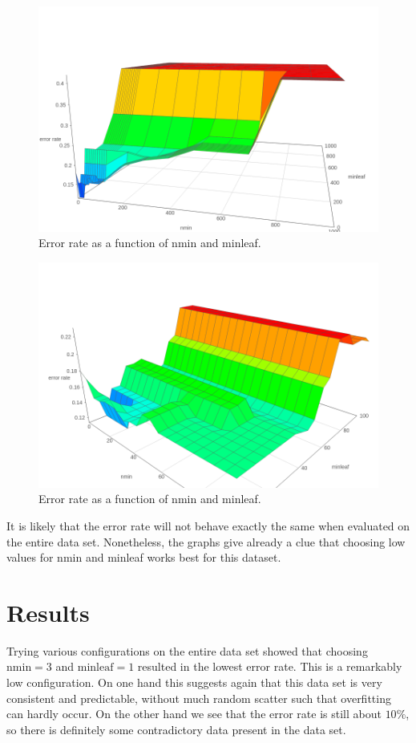 \documentclass[12pt]{article}
\theoremstyle{definition}
\begin{document}
\begin{figure}[H]
    \centering
    \includegraphics[width=0.8\linewidth]{graph1.png}
    \caption{Error rate as a function of nmin and minleaf.}
\label{fig:graph1}
\end{figure}

\begin{figure}[H]
    \centering
    \includegraphics[width=0.8\linewidth]{graph2.png}
    \caption{Error rate as a function of nmin and minleaf.}
\label{fig:graph2}
\end{figure}


It is likely that the error rate will not behave exactly the same when evaluated on
the entire data set.
Nonetheless, the graphs give already a clue that choosing low values for nmin and minleaf
works best for this dataset.

\section{Results}
\label{sec:results}

Trying various configurations on the entire data set showed that choosing
$\mathrm{nmin} = 3$ and $\mathrm{minleaf} = 1$ resulted in the lowest error rate.
This is a remarkably low configuration.
On one hand this suggests again that this data set is very consistent and predictable,
without much random scatter such that overfitting can hardly occur.
On the other hand we see that the error rate is still about $10\%$, so there is definitely
some contradictory data present in the data set.
\end{document}
